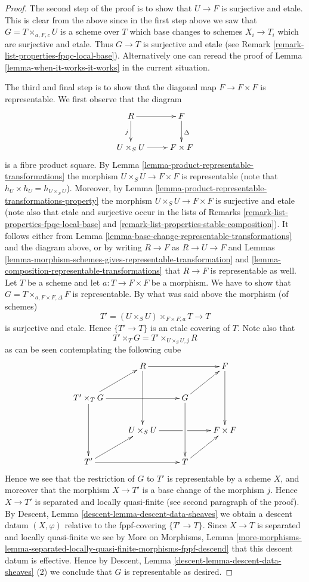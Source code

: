 \begin{proof}
\medskip\noindent
The second step of the proof is to show that $U \to F$ is surjective and
etale. This is clear from the above since in the first step above we
saw that $G = T \times_{a, F, c} U$ is a scheme over $T$ which base changes
to schemes $X_i \to T_i$ which are surjective and etale. Thus $G \to T$
is surjective and etale (see
Remark \ref{remark-list-properties-fpqc-local-base}).
Alternatively one can reread the proof of
Lemma \ref{lemma-when-it-works-it-works} in the current
situation.

\medskip\noindent
The third and final step is to show that the diagonal map $F \to F \times F$
is representable. We first observe that the diagram
$$
\xymatrix{
R \ar[r] \ar[d]_j & F \ar[d]^\Delta \\
U \times_S U \ar[r] & F \times F
}
$$
is a fibre product square. By
Lemma \ref{lemma-product-representable-transformations} the morphism
$U \times_S U \to F \times F$ is representable (note that
$h_U \times h_U = h_{U \times_S U}$). Moreover, by
Lemma \ref{lemma-product-representable-transformations-property}
the morphism $U \times_S U \to F \times F$ is surjective
and etale (note also that etale and surjective occur in the lists of
Remarks \ref{remark-list-properties-fpqc-local-base}
and \ref{remark-list-properties-stable-composition}).
It follows either from
Lemma \ref{lemma-base-change-representable-transformations}
and the diagram above, or by writing $R \to F$ as $R \to U \to F$ and
Lemmas
\ref{lemma-morphism-schemes-gives-representable-transformation} and
\ref{lemma-composition-representable-transformations} that
$R \to F$ is representable as well. Let $T$ be a scheme and let
$a : T \to F \times F$ be a morphism. We have to show that
$G = T \times_{a, F \times F, \Delta} F$ is representable.
By what was said above the morphism (of schemes)
$$
T' = (U \times_S U) \times_{F \times F, a} T \longrightarrow T
$$
is surjective and etale. Hence $\{T' \to T\}$ is an etale
covering of $T$. Note also that
$$
T' \times_T G = T' \times_{U \times_S U, j} R
$$
as can be seen contemplating the following cube
$$
\xymatrix{
& R \ar[rr] \ar[dd] & & F \ar[dd] \\
T' \times_T G \ar[rr] \ar[dd] \ar[ru] & & G \ar[dd] \ar[ru] & \\
& U \times_S U \ar'[r][rr] & & F \times F \\
T' \ar[rr] \ar[ru] & & T \ar[ru]
}
$$
Hence we see that the restriction of $G$ to $T'$ is representable
by a scheme $X$, and moreover that the morphism $X \to T'$ is
a base change of the morphism $j$. Hence $X \to T'$ is
separated and locally quasi-finite (see second paragraph of the proof).
By Descent, Lemma \ref{descent-lemma-descent-data-sheaves}
we obtain a descent datum $(X, \varphi)$ relative
to the fppf-covering $\{T' \to T\}$. Since
$X \to T$ is separated and locally quasi-finite we see by
More on Morphisms, Lemma
\ref{more-morphisms-lemma-separated-locally-quasi-finite-morphisms-fppf-descend}
that this descent datum is effective.
Hence by
Descent, Lemma \ref{descent-lemma-descent-data-sheaves} (2)
we conclude that $G$ is representable as desired.
\end{proof}

